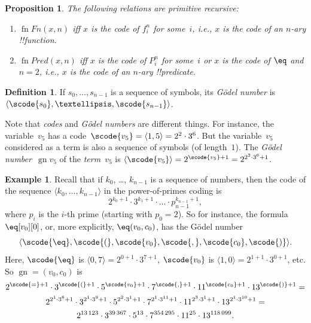 \documentclass[10pt,a4paper]{article}
\theoremstyle{plain}
\newtheorem{prop}[thm]{Proposition}
\theoremstyle{definition}
\newtheorem{defn}[thm]{Definition}
\newtheorem{ex}[thm]{Example}
\theoremstyle{remark}
\newenvironment{explain}{}{}
\providecommand{\Obj}{}
\providecommand{\tuple}[1]{\langle #1 \rangle}
\providecommand{\Gn}{\operatorname{gn}}
\providecommand{\fn}{\operatorname{fn}}
\begin{document}
\begin{prop}
The following relations are primitive recursive:
\begin{enumerate}
\item $\fn{Fn}(x, n)$ iff $x$ is the code of $\Obj f^n_i$ for
  some~$i$, i.e., $x$ is the code of an $n$-ary !!{function}.
\item $\fn{Pred}(x, n)$ iff $x$ is the code of $\Obj P^n_i$ for
  some~$i$ or $x$ is the code of $\eq$ and $n = 2$, i.e., $x$ is the
  code of an $n$-ary !!{predicate}.
\end{enumerate}
\end{prop}

\begin{defn}
If $s_0, \dots, s_{n-1}$ is a sequence of symbols, its \emph{G\"odel
  number} is $\tuple{\scode{s_0}, \dots, \scode{s_{n-1}}}$.
\end{defn}

\begin{explain}
Note that \emph{codes} and \emph{G\"odel numbers} are different
things. For instance, the variable~$\Obj v_5$ has a code~$\scode{\Obj
  v_5} = \tuple{1, 5} = 2^2\cdot 3^6$. But the variable~$\Obj v_5$
considered as a term is also a sequence of symbols (of
length~$1$). The \emph{G\"odel number}~$\Gn{\Obj v_5}$ of the
\emph{term}~$\Obj v_5$ is $\tuple{\scode{\Obj v_5}} = 2^{\scode{\Obj
    v_5} + 1} = 2^{2^2\cdot 3^6 + 1}$.
\end{explain}

\begin{ex}
Recall that if $k_0$, \dots, $k_{n-1}$ is a sequence of numbers, then
the code of the sequence $\tuple{k_0, \dots, k_{n-1}}$ in the
power-of-primes coding is
\[
2^{k_0+1}\cdot3^{k_1+1}\cdot \dots \cdot p_{n-1}^{k_{n-1}+1},
\]
where $p_i$ is the $i$-th prime (starting with $p_0 = 2$). So for
instance, the formula $\eq[\Obj v_0][\Obj 0]$, or, more explicitly,
${\eq}(\Obj v_0,\Obj c_0)$, has the G\"odel number
\[
\tuple{\scode{\eq},\scode{(},\scode{\Obj v_0},\scode{,}, \scode{\Obj
    c_0},\scode{)}}.
\]
Here, $\scode{\eq}$ is $\tuple{0,7} = 2^{0+1}\cdot
3^{7+1}$, $\scode{\Obj v_0}$ is $\tuple{1,0} = 2^{1+1}\cdot3^{0+1}$,
etc. So $\Gn{=(\Obj v_0,\Obj c_0)}$ is
\begin{multline*}
2^{\scode{=} + 1}\cdot 3^{\scode{(}+1}\cdot 5^{\scode{\Obj v_0}+1}
\cdot 7^{\scode{,} + 1} \cdot 11^{\scode{\Obj c_0}+1} \cdot
13^{\scode{)}+1} = \\
2^{2^1\cdot 3^8 + 1}\cdot 3^{2^1\cdot 3^9+1}\cdot 5^{2^2\cdot 3^1+1}
\cdot 7^{2^1\cdot 3^{11} + 1} \cdot 11^{2^3\cdot3^1+1} \cdot
13^{2^1\cdot3^{10}+1} = \\
2^{13\,123}\cdot 3^{39\,367}\cdot 5^{13}\cdot 7^{354\,295}\cdot11^{25}\cdot13^{118\,099}.
\end{multline*}
\end{ex}
\end{document}

